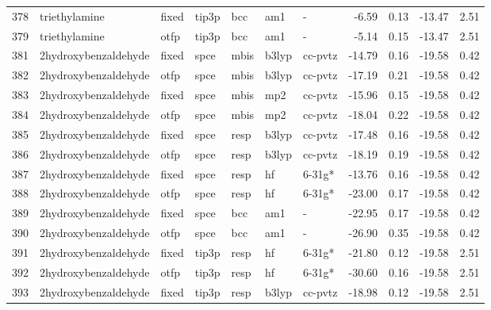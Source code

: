 \begin{tabular}{lllllllrrrr}
378 &                 triethylamine &  fixed &  tip3p &    bcc &     am1 &            - &       -6.59 &     0.13 &      -13.47 &      2.51 \\
379 &                 triethylamine &   otfp &  tip3p &    bcc &     am1 &            - &       -5.14 &     0.15 &      -13.47 &      2.51 \\
381 &          2hydroxybenzaldehyde &  fixed &   spce &   mbis &   b3lyp &      cc-pvtz &      -14.79 &     0.16 &      -19.58 &      0.42 \\
382 &          2hydroxybenzaldehyde &   otfp &   spce &   mbis &   b3lyp &      cc-pvtz &      -17.19 &     0.21 &      -19.58 &      0.42 \\
383 &          2hydroxybenzaldehyde &  fixed &   spce &   mbis &     mp2 &      cc-pvtz &      -15.96 &     0.15 &      -19.58 &      0.42 \\
384 &          2hydroxybenzaldehyde &   otfp &   spce &   mbis &     mp2 &      cc-pvtz &      -18.04 &     0.22 &      -19.58 &      0.42 \\
385 &          2hydroxybenzaldehyde &  fixed &   spce &   resp &   b3lyp &      cc-pvtz &      -17.48 &     0.16 &      -19.58 &      0.42 \\
386 &          2hydroxybenzaldehyde &   otfp &   spce &   resp &   b3lyp &      cc-pvtz &      -18.19 &     0.19 &      -19.58 &      0.42 \\
387 &          2hydroxybenzaldehyde &  fixed &   spce &   resp &      hf &       6-31g* &      -13.76 &     0.16 &      -19.58 &      0.42 \\
388 &          2hydroxybenzaldehyde &   otfp &   spce &   resp &      hf &       6-31g* &      -23.00 &     0.17 &      -19.58 &      0.42 \\
389 &          2hydroxybenzaldehyde &  fixed &   spce &    bcc &     am1 &            - &      -22.95 &     0.17 &      -19.58 &      0.42 \\
390 &          2hydroxybenzaldehyde &   otfp &   spce &    bcc &     am1 &            - &      -26.90 &     0.35 &      -19.58 &      0.42 \\
391 &          2hydroxybenzaldehyde &  fixed &  tip3p &   resp &      hf &       6-31g* &      -21.80 &     0.12 &      -19.58 &      2.51 \\
392 &          2hydroxybenzaldehyde &   otfp &  tip3p &   resp &      hf &       6-31g* &      -30.60 &     0.16 &      -19.58 &      2.51 \\
393 &          2hydroxybenzaldehyde &  fixed &  tip3p &   resp &   b3lyp &      cc-pvtz &      -18.98 &     0.12 &      -19.58 &      2.51 \\

\end{tabular}
